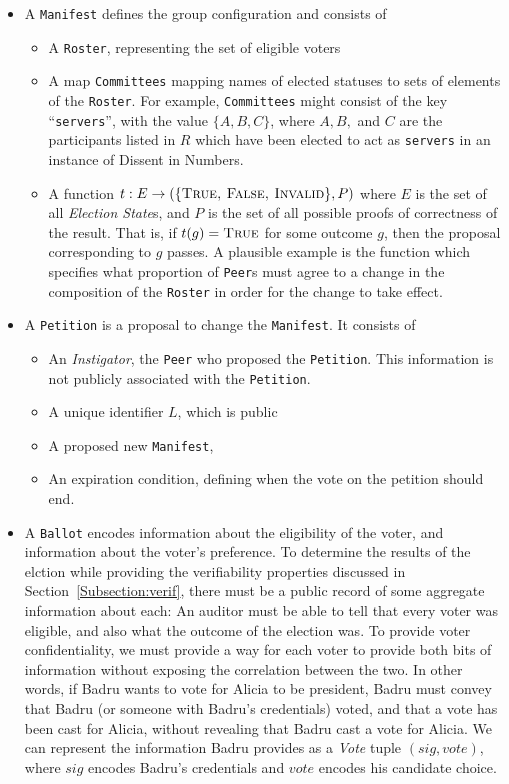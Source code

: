 \begin{itemize}
  \item A \texttt{Manifest} defines the group configuration and consists of
  \begin{itemize}
    \item A \texttt{Roster}, representing the set of eligible voters
    \item A map \texttt{Committees} mapping names of elected statuses to sets of
      elements of the \texttt{Roster}. For example, \texttt{Committees} might
      consist of the key ``\texttt{servers}'', with the value $\{A, B, C\}$, where
      $A, B,$ and $C$ are the participants listed in $R$ which have been elected
      to act as \texttt{servers} in an instance of Dissent in Numbers.
    \item A function $t : E \to (\{\textsc{True, False, Invalid}\}, P)$
      where $E$ is the set of all \emph{Election State}s, and $P$ is the set
      of all possible proofs of correctness of the result. That is, if $t(g) =
      \textsc{True}$ for some outcome $g$, then the proposal corresponding to
      $g$ passes.
      A plausible example is the function which
      specifies what proportion of \texttt{Peer}s must agree to a change in the
      composition of the \texttt{Roster} in order for the change to take effect.
  \end{itemize}
  \item A \texttt{Petition} is a proposal to change the \texttt{Manifest}. It
    consists of
    \begin{itemize}
      \item An \emph{Instigator}, the \texttt{Peer} who proposed the
        \texttt{Petition}. This information is not publicly associated with
        the \texttt{Petition}.
      \item A unique identifier $L$, which is public
      \item A proposed new \texttt{Manifest},
      \item An expiration condition, defining when the vote on the petition
        should end.
    \end{itemize}
  \item A \texttt{Ballot} encodes information about the eligibility of the voter,
    and information about the voter's preference. To determine the results of
    the elction while providing the verifiability properties discussed in
    Section~\ref{Subsection:verif}, there must be a public record of some
    aggregate information about each: An auditor must be able to tell that every
    voter was eligible, and also what the outcome of the election was. To
    provide voter confidentiality, we must provide a way for each voter to
    provide both bits of information without exposing the correlation between
    the two. In other words, if Badru wants to vote for Alicia to be president,
    Badru must convey that Badru (or someone with Badru's credentials) voted,
    and that a vote has been cast for Alicia, without revealing that Badru cast
    a vote for Alicia. We can represent the information Badru provides as a
    \emph{Vote} tuple $(sig, vote)$, where $sig$ encodes Badru's credentials and
    $vote$ encodes his candidate choice.


\end{itemize}
